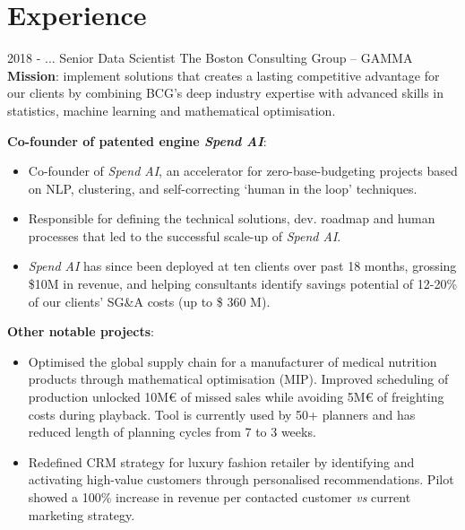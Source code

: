 \documentclass[letterpaper]{twentysecondcv} %
\begin{document}
	
	\makeprofile %
	
	
	
	\section{Experience}{\faAlignJustify}
	
	\begin{twenty} %
		\twentyitem
		{2018 - ...}
		{}
		{Senior Data Scientist}
		{The Boston Consulting Group -- GAMMA}
		{\vspace*{1mm}\textbf{Mission}: implement solutions that creates a lasting competitive advantage for our clients by combining BCG's deep industry expertise with advanced skills in statistics, machine learning and mathematical optimisation.
		\medskip
	    }
		{
			\textbf{Co-founder of patented engine \textit{Spend AI}}:
			\begin{itemize}
				\item Co-founder of \textit{Spend AI}, an accelerator for zero-base-budgeting projects based on NLP, clustering, and self-correcting `human in the loop' techniques.
				\item Responsible for defining the technical solutions, dev. roadmap and human processes that led to the successful scale-up of \textit{Spend AI}.
				\item \textit{Spend AI} has since been deployed at ten clients over past 18 months, grossing \$10M in revenue, and helping consultants identify savings potential of 12-20\% of our clients' SG\&A costs (up to \$ 360 M).
		 	\end{itemize}
		
		\medskip
			
			\textbf{Other notable projects}:
			\begin{itemize}
				\item Optimised the global supply chain for a manufacturer of medical nutrition products through mathematical optimisation  (MIP). Improved scheduling of production unlocked 10M€ of missed sales while avoiding 5M€ of freighting costs during playback. Tool is currently used by 50+ planners and has reduced length of planning cycles from 7 to 3 weeks.
				\item Redefined CRM strategy for luxury fashion retailer by identifying and activating high-value customers through personalised recommendations. Pilot showed a 100\% increase in revenue per contacted customer \textit{vs} current marketing strategy.
		\end{itemize}
	
}
\end{twenty}
\end{document}
